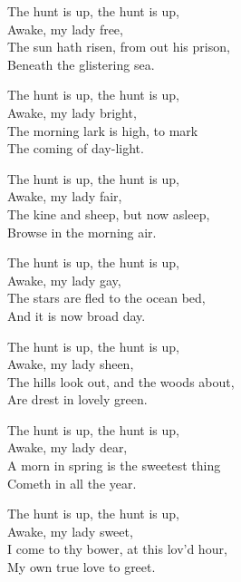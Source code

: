 \settowidth{\versewidth}{The hunt is up, the hunt is up,}
\begin{dcverse}\begin{altverse}
The hunt is up, the hunt is up,\\
Awake, my lady free,\\
The sun hath risen, from out his prison,\\
Beneath the glistering sea.
\end{altverse}

\begin{altverse}
The hunt is up, the hunt is up,\\
Awake, my lady bright,\\
The morning lark is high, to mark\\
The coming of day-light.
\end{altverse}

\begin{altverse}
The hunt is up, the hunt is up,\\
Awake, my lady fair,\\
The kine and sheep, but now asleep,\\
Browse in the morning air.
\end{altverse}

\begin{altverse}
The hunt is up, the hunt is up,\\
Awake, my lady gay,\\
The stars are fled to the ocean bed,\\
And it is now broad day.
\end{altverse}

\begin{altverse}
The hunt is up, the hunt is up,\\
Awake, my lady sheen,\\
The hills look out, and the woods about,\\
Are drest in lovely green.
\end{altverse}

\begin{altverse}
The hunt is up, the hunt is up,\\
Awake, my lady dear,\\
A morn in spring is the sweetest thing\\
Cometh in all the year.
\end{altverse}
\end{dcverse}

\begin{scverse}\begin{altverse}
The hunt is up, the hunt is up,\\
Awake, my lady sweet,\\
I come to thy bower, at this lov'd hour,\\
My own true love to greet.
\end{altverse}
\end{scverse}
\normalsize
\pagebreak

